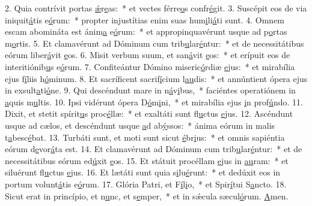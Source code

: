 2. Quia contrívit portas \uline{ǽ}r\uline{e}as:~* et vectes férre\uline{o}s confr\uline{é}git.
3. Suscépit eos de via iniquit\uline{á}tis e\uline{ó}rum:~* propter injustítias enim suas hum\uline{i}li\uline{á}ti sunt.
4. Omnem escam abomináta est ánim\uline{a} e\uline{ó}rum:~* et appropinquavérunt usque ad p\uline{o}rtas m\uline{o}rtis.
5. Et clamavérunt ad Dóminum cum trib\uline{u}lar\uline{é}ntur:~* et de necessitátibus eórum liber\uline{á}vit \uline{e}os.
6. Misit verbum suum, et san\uline{á}vit \uline{e}os:~* et erípuit eos de interitiónib\uline{u}s e\uline{ó}rum.
7. Confiteántur Dómino miseric\uline{ó}rdiæ \uline{e}jus:~* et mirabília ejus f\uline{í}liis h\uline{ó}minum.
8. Et sacríficent sacrif\uline{í}cium l\uline{au}dis:~* et annúntient ópera ejus in exsult\uline{a}ti\uline{ó}ne.
9. Qui descéndunt mare in n\uline{á}v\uline{i}bus,~* faciéntes operatiónem in \uline{a}quis m\uline{u}ltis.
10. Ipsi vidérunt ópera D\uline{ó}m\uline{i}ni,~* et mirabília ejus \uline{i}n prof\uline{ú}ndo.
11. Dixit, et stetit spírit\uline{u}s proc\uline{é}llæ:~* et exaltáti sunt fl\uline{u}ctus \uline{e}jus.
12. Ascéndunt usque ad cælos, et descéndunt usque \uline{a}d ab\uline{ý}ssos:~* ánima eórum in malis t\uline{a}besc\uline{é}bat.
13. Turbáti sunt, et moti sunt sicut \uline{é}br\uline{i}us:~* et omnis sapiéntia eórum d\uline{e}vor\uline{á}ta est.
14. Et clamavérunt ad Dóminum cum trib\uline{u}lar\uline{é}ntur:~* et de necessitátibus eórum ed\uline{ú}xit \uline{e}os.
15. Et státuit procéllam \uline{e}jus in \uline{au}ram:~* et siluérunt fl\uline{u}ctus \uline{e}jus.
16. Et lætáti sunt quia s\uline{i}lu\uline{é}runt:~* et dedúxit eos in portum volunt\uline{á}tis e\uline{ó}rum.
17. Glória Patri, et F\uline{í}l\uline{i}o,~* et Spir\uline{í}tui S\uline{a}ncto.
18. Sicut erat in princípio, et n\uline{u}nc, et s\uline{e}mper,~* et in sǽcula sæcul\uline{ó}rum. \uline{A}men.
